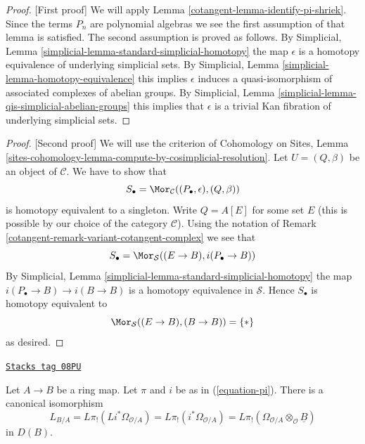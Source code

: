 \begin{proof}
[First proof]
We will apply Lemma \ref{cotangent-lemma-identify-pi-shriek}.
Since the terms $P_n$ are polynomial algebras we see the first
assumption of that lemma is satisfied. The second assumption is proved
as follows. By
Simplicial, Lemma \ref{simplicial-lemma-standard-simplicial-homotopy}
the map $\epsilon$ is a homotopy equivalence of underlying
simplicial sets. By
Simplicial, Lemma \ref{simplicial-lemma-homotopy-equivalence}
this implies $\epsilon$ induces a quasi-isomorphism of associated
complexes of abelian groups. By
Simplicial, Lemma \ref{simplicial-lemma-qis-simplicial-abelian-groups}
this implies that $\epsilon$ is a trivial Kan fibration of underlying
simplicial sets.
\end{proof}

\begin{proof}
[Second proof]
We will use the criterion of Cohomology on Sites, Lemma
\ref{sites-cohomology-lemma-compute-by-cosimplicial-resolution}.
Let $U = (Q, \beta)$ be an object of $\mathcal{C}$.
We have to show that
$$
S_\bullet = \Mor_\mathcal{C}((P_\bullet, \epsilon), (Q, \beta))
$$
is homotopy equivalent to a singleton. Write $Q = A[E]$ for some set $E$
(this is possible by our choice of the category $\mathcal{C}$). Using the
notation of Remark \ref{cotangent-remark-variant-cotangent-complex} we see that
$$
S_\bullet = \Mor_\mathcal{S}((E \to B), i(P_\bullet \to B))
$$
By Simplicial, Lemma \ref{simplicial-lemma-standard-simplicial-homotopy}
the map $i(P_\bullet \to B) \to i(B \to B)$ is a homotopy equivalence
in $\mathcal{S}$. Hence $S_\bullet$ is homotopy equivalent to
$$
\Mor_\mathcal{S}((E \to B), (B \to B)) = \{*\}
$$
as desired.
\end{proof}

\begin{lemma}
\label{cotangent-lemma-compute-cotangent-complex}
\href{https://stacks.math.columbia.edu/tag/08PU}{\texttt{Stacks tag 08PU}}

Let $A \to B$ be a ring map.  Let $\pi$ and $i$ be as in (\ref{equation-pi}).
There is a canonical isomorphism
$$
L_{B/A} = L\pi_!(Li^*\Omega_{\mathcal{O}/A}) =
L\pi_!(i^*\Omega_{\mathcal{O}/A}) =
L\pi_!(\Omega_{\mathcal{O}/A} \otimes_\mathcal{O} \underline{B})
$$
in $D(B)$.
\end{lemma}

